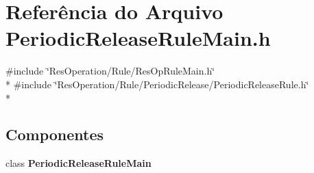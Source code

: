 \section{Referência do Arquivo Periodic\+Release\+Rule\+Main.\+h}
\label{_rule_2_periodic_release_2_periodic_release_rule_main_8h}
{\ttfamily \#include \char`\"{}Res\+Operation/\+Rule/\+Res\+Op\+Rule\+Main.\+h\char`\"{}}\\*
{\ttfamily \#include \char`\"{}Res\+Operation/\+Rule/\+Periodic\+Release/\+Periodic\+Release\+Rule.\+h\char`\"{}}\\*
\subsection*{Componentes}
\begin{DoxyCompactItemize}
\item 
class {\bf Periodic\+Release\+Rule\+Main}
\end{DoxyCompactItemize}
